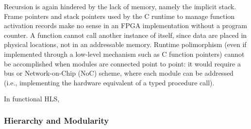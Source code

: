 \par Recursion is again hindered by the lack of memory, namely the implicit stack. Frame pointers and stack pointers used by the C runtime to manage function activation records make no sense in an FPGA implementation without a program counter. A function cannot call another instance of itself, since data are placed in physical locations, not in an addressable memory. Runtime polimorphism (even if implemented through a low-level mechanism such as C function pointers) cannot be accomplished when modules are connected point to point: it would require a bus or Network-on-Chip (NoC) scheme, where each module can be addressed (i.e., implementing the hardware equivalent of a typed procedure call).

\par In functional HLS, 


	
\subsubsection{Hierarchy and Modularity}


